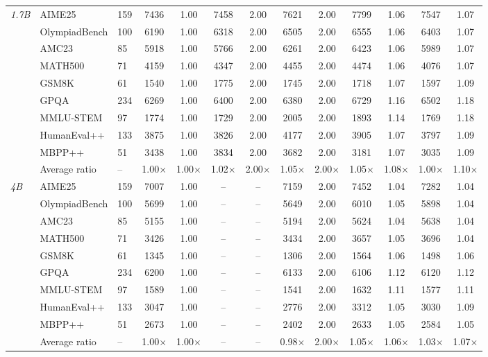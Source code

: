 \begin{table}[t]
\begin{tabular}{lll|cc|cc|cc|cc|cc}
    \midrule
    \multirow{10}{*}{\textit{1.7B}}& AIME25        & 159& 7436& 1.00& 7458& 2.00& 7621&2.00& 7799& 1.06& 7547& 1.07\\
    & OlympiadBench & 100& 6190& 1.00& 6318& 2.00& 6505&2.00& 6555& 1.06& 6403& 1.07\\
    & AMC23         & 85& 5918& 1.00& 5766& 2.00& 6261&2.00& 6423& 1.06& 5989& 1.07\\
    & MATH500       & 71& 4159& 1.00& 4347& 2.00& 4455&2.00& 4474& 1.06& 4076& 1.07\\
    & GSM8K         & 61& 1540& 1.00& 1775& 2.00& 1745&2.00& 1718& 1.07& 1597& 1.09\\
    & GPQA          & 234& 6269& 1.00& 6400& 2.00& 6380&2.00& 6729& 1.16& 6502& 1.18\\
    & MMLU-STEM     & 97& 1774& 1.00& 1729& 2.00& 2005&2.00& 1893& 1.14& 1769& 1.18\\
    & HumanEval++   & 133& 3875& 1.00& 3826& 2.00& 4177&2.00& 3905& 1.07& 3797& 1.09\\
    & MBPP++        & 51& 3438& 1.00& 3834& 2.00& 3682&2.00& 3181& 1.07& 3035& 1.09\\
    \cmidrule(lr){2-13}
    & Average ratio & --& 1.00$\times$ & 1.00$\times$& 1.02$\times$& 2.00$\times$& 1.05$\times$ &2.00$\times$& 1.05$\times$ & 1.08$\times$ & 1.00$\times$ & 1.10$\times$ \\

    \midrule
    \multirow{10}{*}{\textit{4B}}& AIME25        & 159& 7007& 1.00& --& --& 7159&2.00& 7452& 1.04& 7282& 1.04\\
    & OlympiadBench & 100& 5699& 1.00& --& --& 5649&2.00& 6010& 1.05& 5898& 1.04\\
    & AMC23         & 85& 5155& 1.00& --& --& 5194&2.00& 5624& 1.04& 5638& 1.04\\
    & MATH500       & 71& 3426& 1.00& --& --& 3434&2.00& 3657& 1.05& 3696& 1.04\\
    & GSM8K         & 61& 1345& 1.00& --& --& 1306&2.00& 1564& 1.06& 1498& 1.06\\
    & GPQA          & 234& 6200& 1.00& --& --& 6133&2.00& 6106& 1.12& 6120& 1.12\\
    & MMLU-STEM     & 97& 1589& 1.00& --& --& 1541&2.00& 1632& 1.11& 1577& 1.11\\
    & HumanEval++   & 133& 3047& 1.00& --& --& 2776&2.00& 3312& 1.05& 3030& 1.09\\
    & MBPP++        & 51& 2673& 1.00& --& --& 2402&2.00& 2633& 1.05& 2584& 1.05\\
    \cmidrule(lr){2-13}
   & Average ratio & --& 1.00$\times$& 1.00$\times$& --& -- & 0.98$\times$&2.00$\times$& 1.05$\times$ &1.06$\times$ & 1.03$\times$ & 1.07$\times$\\


    \bottomrule
    \end{tabular}
\end{table}

